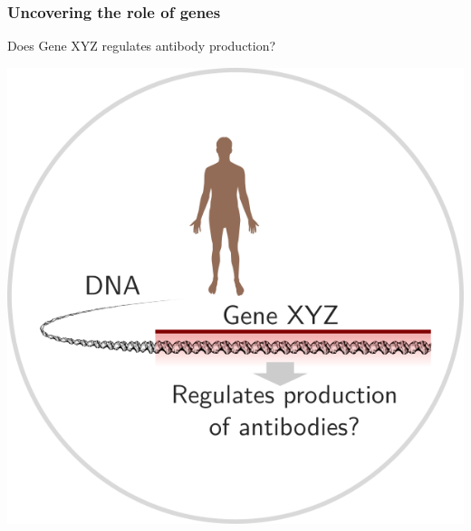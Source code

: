 \documentclass[aspectratio=169, 9pt, handout]{beamer}
\begin{document}
\begin{frame}[c]
	\frametitle{Uncovering the role of genes}
	
	\Large Does Gene XYZ regulates antibody production?\normalsize\bigskip
	
	\begin{minipage}[m]{.33\linewidth}
		\includegraphics[width=1\linewidth]{aphylo-data-0.png}
	\end{minipage}\hfill
\end{frame}
\end{document}
